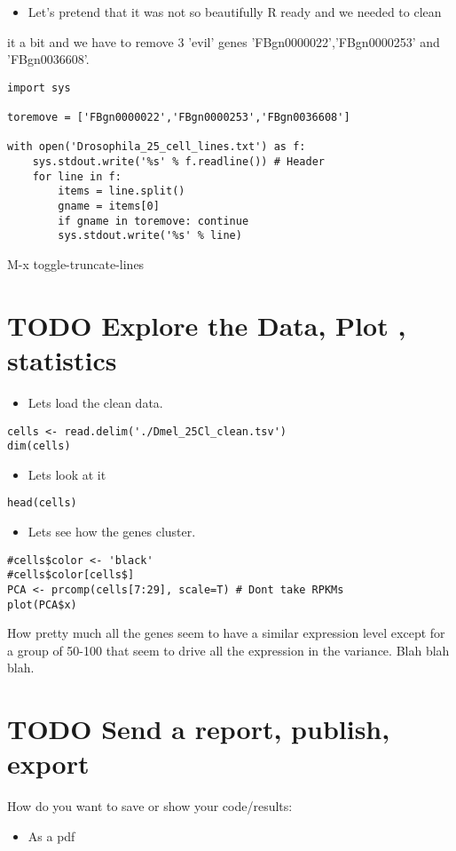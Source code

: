 \documentclass[11pt]{article}
\begin{document}
\begin{itemize}
\item Let's pretend that it was not so beautifully R ready and we needed to clean
\end{itemize}
it a bit and we have to remove 3 'evil' genes 'FBgn0000022','FBgn0000253' and 'FBgn0036608'.
\begin{verbatim}
import sys

toremove = ['FBgn0000022','FBgn0000253','FBgn0036608']

with open('Drosophila_25_cell_lines.txt') as f:
    sys.stdout.write('%s' % f.readline()) # Header
    for line in f:
        items = line.split()
        gname = items[0]
        if gname in toremove: continue
        sys.stdout.write('%s' % line)
\end{verbatim}
M-x toggle-truncate-lines
\section{{\bfseries\sffamily TODO} Explore the Data, Plot , statistics}
\label{sec:org72d158c}

\begin{itemize}
\item Lets load the clean data.
\end{itemize}
\begin{verbatim}
cells <- read.delim('./Dmel_25Cl_clean.tsv')
dim(cells)
\end{verbatim}

\begin{itemize}
\item Lets look at it
\end{itemize}
\begin{verbatim}
head(cells)
\end{verbatim}

\begin{itemize}
\item Lets see how the genes cluster.
\end{itemize}
\begin{verbatim}
#cells$color <- 'black'
#cells$color[cells$]
PCA <- prcomp(cells[7:29], scale=T) # Dont take RPKMs
plot(PCA$x)
\end{verbatim}


How pretty much all the genes seem to have a similar expression level except
for a group of 50-100 that seem to drive all the expression in the variance.
Blah blah blah.

\section{{\bfseries\sffamily TODO} Send a report, publish, export}
\label{sec:org5014627}
How do you want to save or show your code/results:
\begin{itemize}
\item As a pdf
\end{itemize}
\end{document}

